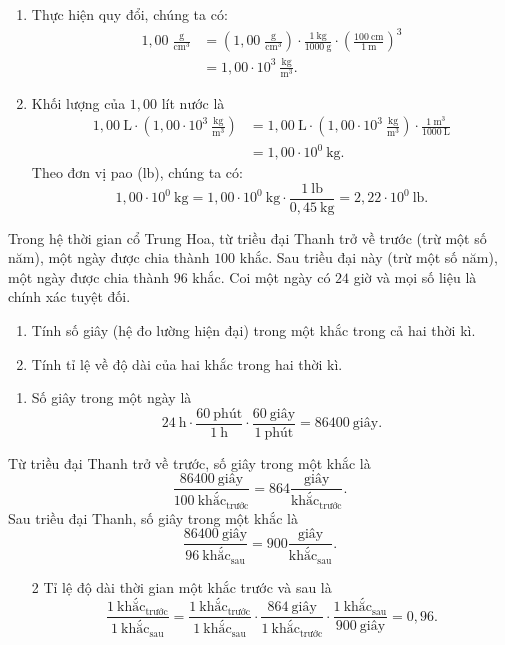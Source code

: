 \documentclass[a4paper, titlepage, openany]{book}
\newcounter{exercise}
\newcounter{solution}
\numberwithin{equation}{chapter}
\begin{document}
\solution
\begin{enumerate}
   \item Thực hiện quy đổi, chúng ta có:
   \begin{align*}
      1{,}00\;\frac{\text{g}}{\text{cm}^3} &= \left(1{,}00\;\frac{\text{g}}{\text{cm}^3}\right)\cdot\frac{1\ \text{kg}}{1000\ \text{g}}\cdot\left(\frac{100\ \text{cm}}{1\ \text{m}}\right)^3 \\
      &= \boxed{1{,}00\cdot 10^3\ \frac{\text{kg}}{\text{m}^3}}.
   \end{align*}
   \item Khối lượng của $1{,}00$ lít nước là
   \begin{align*}
      1{,}00\ \text{L} \cdot \left(1{,}00\cdot 10^3\ \frac{\text{kg}}{\text{m}^3}\right)&= 1{,}00\ \text{L} \cdot \left(1{,}00\cdot 10^3\ \frac{\text{kg}}{\text{m}^3}\right) \cdot \frac{1\ \text{m}^3}{1000\ \text{L}} \\
      &= \boxed{1{,}00\cdot 10^0\ \text{kg}}.
   \end{align*}
   Theo đơn vị pao (lb), chúng ta có:
   \[
      1{,}00\cdot 10^0\ \text{kg} = 1{,}00\cdot 10^0\ \text{kg} \cdot \frac{1\ \text{lb}}{0{,}45\ \text{kg}} = \boxed{2{,}22\cdot 10^0\ \text{lb}}.
   \]
\end{enumerate}

\exercise Trong hệ thời gian cổ Trung Hoa, từ triều đại Thanh trở về trước (trừ một số năm), một ngày được chia thành $100$ khắc. Sau triều đại này (trừ một số năm), một ngày được chia thành $96$ khắc. Coi một ngày có $24$ giờ và mọi số liệu là chính xác tuyệt đối.
\begin{enumerate}
   \item Tính số giây (hệ đo lường hiện đại) trong một khắc trong cả hai thời kì.
   \item Tính tỉ lệ về độ dài của hai khắc trong hai thời kì.
\end{enumerate}

\solution
\begin{enumerate}
   \item Số giây trong một ngày là $$24\ \text{h} \cdot \frac{60\ \text{phút}}{1\ \text{h}} \cdot \frac{60\ \text{giây}}{1\ \text{phút}} = 86400\ \text{giây}.$$
\end{enumerate}
Từ triều đại Thanh trở về trước, số giây trong một khắc là $$\frac{86400\ \text{giây}}{100\ \text{khắc}_{\text{trước}}} = \boxed{864 \frac{\text{giây}}{\text{khắc}_{\text{trước}}}}.$$
Sau triều đại Thanh, số giây trong một khắc là $$\frac{86400\ \text{giây}}{96\ \text{khắc}_{\text{sau}}} = \boxed{900 \frac{\text{giây}}{\text{khắc}_{\text{sau}}}}.$$
\begin{enumerate}
   \item[2] Tỉ lệ độ dài thời gian một khắc trước và sau là $$\frac{1\ \text{khắc}_{\text{trước}}}{1\ \text{khắc}_{\text{sau}}} = \frac{1\ \text{khắc}_{\text{trước}}}{1\ \text{khắc}_{\text{sau}}}\cdot \frac{864\ \text{giây}}{1\ \text{khắc}_{\text{trước}}}\cdot\frac{1\ \text{khắc}_{\text{sau}}}{900\ \text{giây}}=\boxed{0{,}96}.$$
\end{enumerate}
\end{document}
